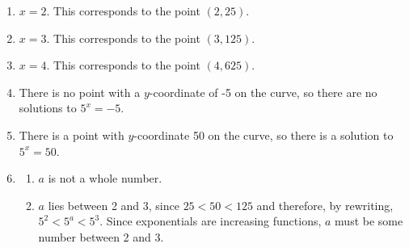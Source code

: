 \documentclass[noauthor]{ximera}
\begin{document}
\begin{problem}
\begin{explanation}
\begin{enumerate}
    \item \(x = 2\). This corresponds to the point \((2, 25)\).
    \item \(x = 3\). This corresponds to the point \((3, 125)\).
    \item \(x = 4\). This corresponds to the point \((4, 625)\).
    \item There is no point with a 
    \(y\)-coordinate of -5 on the curve, so there are no solutions
    to \(5^x = -5\).
    \item There is a point with \(y\)-coordinate
    50 on the curve, so there is a solution to \(5^x = 50\).
    \item \begin{enumerate}
        \item \(a\) is not a whole number.
        \item \(a\) lies between 2 and 3, since 
        \(25 < 50 < 125\) and therefore, by rewriting, \(5^2 < 5^a < 5^3\).
        Since exponentials are increasing functions, \(a\) must be some number between 2 and 3.
    \end{enumerate}
\end{enumerate}
\end{explanation}
\end{problem}
\end{document}
